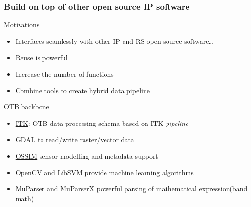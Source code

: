 \documentclass[8pt]{beamer}
\begin{document}
\begin{frame}
\frametitle{Build on top of other open source IP software}
\begin{block}{Motivations}
\begin{itemize}
\item Interfaces seamlessly with other IP and RS open-source software\ldots
\item Reuse is powerful
\item Increase the number of functions
\item Combine tools to create hybrid data pipeline
\end{itemize} 
\end{block}

\begin{block}{OTB backbone}
\begin{itemize}
\item \href{www.itk.org}{ITK}: OTB data processing schema based on ITK \emph{pipeline}
\item \href{www.gdal.org}{GDAL} to read/write raster/vector data
\item \href{www.ossim.org}{OSSIM} sensor modelling and metadata support 
\item \href{www.opencv.org}{OpenCV} and \href{www.libsvm.org}{LibSVM} provide
  machine learning algorithms
\item \href{www.muparser.org}{MuParser} and \href{www.muparserx.org}{MuParserX}
  powerful parsing of mathematical expression(band math)
\end{itemize}
\end{block}


\end{frame}
\end{document}

